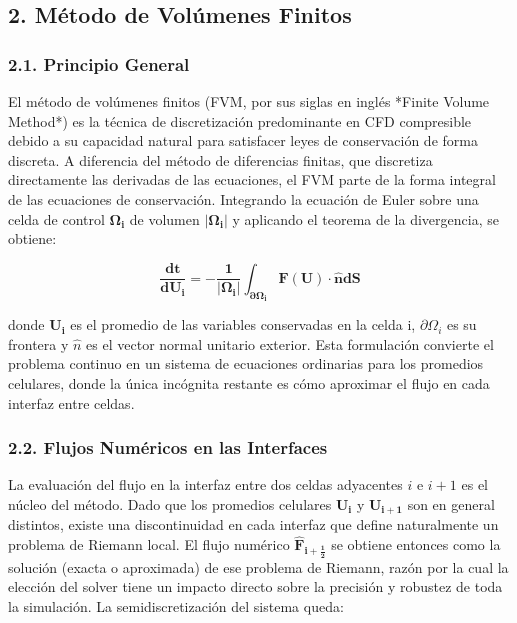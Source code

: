 \documentclass[11pt,openany]{book}
\begin{document}
\subsection{2. Método de Volúmenes Finitos}

\subsubsection{2.1. Principio General}\textbf{}

El método de volúmenes finitos (FVM, por sus siglas en inglés *Finite Volume Method*) es la técnica de discretización predominante en CFD compresible debido a su capacidad natural para satisfacer leyes de conservación de forma discreta. A diferencia del método de diferencias finitas, que discretiza directamente las derivadas de las ecuaciones, el FVM parte de la forma integral de las ecuaciones de conservación. Integrando la ecuación de Euler sobre una celda de control $\mathbf{\Omega_i}$ de volumen $\mathbf{|\Omega_i|}$ y aplicando el teorema de la divergencia, se obtiene:

\begin{equation}
    \mathbf{\frac{dt}{dU_i} = - \frac{1}{\lvert \Omega_i \rvert}\int_{\partial\Omega_i}^{}F(U)\cdot \hat{n}dS}
\end{equation}

donde $\mathbf{U_i}$ es el promedio de las variables conservadas en la celda i, $\partial\Omega_i$ es su frontera y $\hat{n}$ es el vector normal unitario exterior. Esta formulación convierte el problema continuo en un sistema de ecuaciones ordinarias para los promedios celulares, donde la única incógnita restante es cómo aproximar el flujo en cada interfaz entre celdas.

\subsubsection{2.2. Flujos Numéricos en las Interfaces}\textbf{}

La evaluación del flujo en la interfaz entre dos celdas adyacentes $i$ e $i+1$ es el núcleo del método. Dado que los promedios celulares $\mathbf{U_i}$ y $\mathbf{U_{i+1}}$ son en general distintos, existe una discontinuidad en cada interfaz que define naturalmente un problema de Riemann local. El flujo numérico $\mathbf{\hat{F}_{i+\frac{1}{2}}}$ se obtiene entonces como la solución (exacta o aproximada) de ese problema de Riemann, razón por la cual la elección del solver tiene un impacto directo sobre la precisión y robustez de toda la simulación. La semidiscretización del sistema queda:
\end{document}
